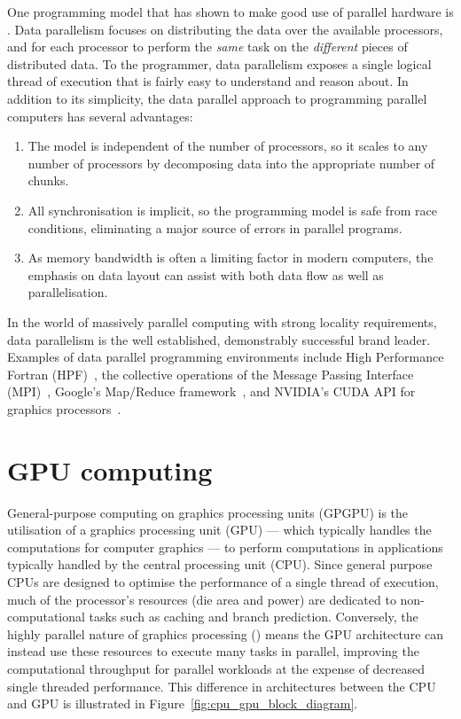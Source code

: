 One programming model that has shown to make good use of parallel hardware is
.
Data parallelism focuses on distributing the data over the available processors,
and for each processor to perform the \emph{same} task on the \emph{different}
pieces of distributed data. To the programmer, data parallelism exposes a single
logical thread of execution that is fairly easy to understand and reason about.
In addition to its simplicity, the data parallel approach to programming
parallel computers has several advantages:
%
\begin{enumerate}
\item The model is independent of the number of processors, so it scales to any
    number of processors by decomposing data into the appropriate number of
    chunks.

\item All synchronisation is implicit, so the programming model is safe from
    race conditions, eliminating a major source of errors in parallel programs.

\item As memory bandwidth is often a limiting factor in modern computers, the
    emphasis on data layout can assist with both data flow as well as
    parallelisation.
\end{enumerate}
%
In the world of massively parallel computing with strong locality requirements,
data parallelism is the well established, demonstrably successful brand leader.
Examples of data parallel programming environments include High Performance
Fortran (HPF)~\cite{HPF:1997}, the collective operations of the Message Passing
Interface (MPI)~\cite{MPI:2012}, Google's Map/Reduce
framework~\cite{Dean:2008fi}, and NVIDIA's CUDA\cuda{} API for graphics
processors~\cite{NVIDIA:2012wf}.


\section{GPU computing} %
\label{sec:gpu_computing}

\cuda[|(]{}
\gpu[|(]{}

General-purpose computing on graphics processing units (GPGPU\gpgpu)
is the utilisation of a graphics processing unit (GPU\gpu) ---
which typically handles the computations for computer graphics --- to perform
computations in applications typically handled by the central processing unit
(CPU). Since general purpose CPUs are designed to optimise the performance of a
single thread of execution, much of the processor's resources (die area and
power) are dedicated to non-computational tasks such as caching and branch
prediction. Conversely, the highly parallel nature of graphics processing
() means the GPU architecture can instead use these
resources to execute many tasks in parallel, improving the computational
throughput for parallel workloads at the expense of decreased single threaded
performance. This difference in architectures between the CPU and GPU is
illustrated in Figure~\ref{fig:cpu_gpu_block_diagram}.

